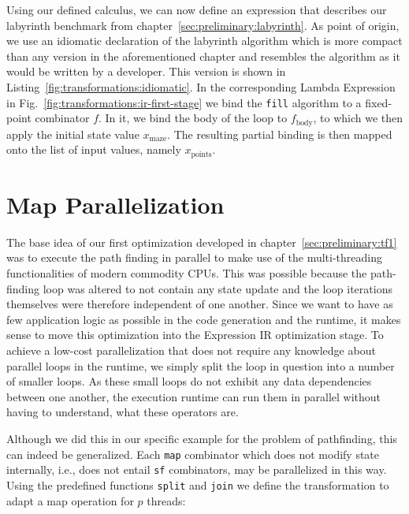 Using our defined calculus, we can now define an expression that describes our labyrinth benchmark from chapter~\ref{sec:preliminary:labyrinth}.
As point of origin, we use an idiomatic declaration of the labyrinth algorithm which is more compact than any version in the aforementioned chapter and resembles the algorithm as it would be written by a developer.
This version is shown in Listing~\ref{fig:transformations:idiomatic}.
In the corresponding Lambda Expression in Fig.~\ref{fig:transformations:ir-first-stage} we bind the \texttt{fill} algorithm to a fixed-point combinator $f$.
In it, we bind the body of the loop to $f_\text{body}$, to which we then apply the initial state value $x_\text{maze}$.
The resulting partial binding is then mapped onto the list of input values, namely $x_\text{points}$.

\pagebreak

\section{Map Parallelization}%
\label{sec:transformations:tf1}

The base idea of our first optimization developed in chapter~\ref{sec:preliminary:tf1} was to execute the path finding in parallel to make use of the multi-threading functionalities of modern commodity CPUs.
This was possible because the path-finding loop was altered to not contain any state update and the loop iterations themselves were therefore independent of one another.
Since we want to have as few application logic as possible in the code generation and the runtime, it makes sense to move this optimization into the Expression IR optimization stage.
To achieve a low-cost parallelization that does not require any knowledge about parallel loops in the runtime, we simply split the loop in question into a number of smaller loops.
As these small loops do not exhibit any data dependencies between one another, the execution runtime can run them in parallel without having to understand, what these operators are.

Although we did this in our specific example for the problem of pathfinding, this can indeed be generalized.
Each \texttt{map} combinator which does not modify state internally, i.e., does not entail \texttt{sf} combinators, may be parallelized in this way.
Using the predefined functions \texttt{split} and \texttt{join} we define the transformation to adapt a map operation for $p$ threads:

